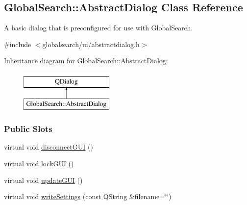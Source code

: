 \hypertarget{classGlobalSearch_1_1AbstractDialog}{}\subsection{Global\+Search\+:\+:Abstract\+Dialog Class Reference}
\label{classGlobalSearch_1_1AbstractDialog}


A basic dialog that is preconfigured for use with Global\+Search.  




{\ttfamily \#include $<$globalsearch/ui/abstractdialog.\+h$>$}

Inheritance diagram for Global\+Search\+:\+:Abstract\+Dialog\+:\begin{figure}[H]
\begin{center}
\leavevmode
\includegraphics[height=2.000000cm]{classGlobalSearch_1_1AbstractDialog}
\end{center}
\end{figure}
\subsubsection*{Public Slots}
\begin{DoxyCompactItemize}
\item 
virtual void \hyperlink{classGlobalSearch_1_1AbstractDialog_af25e016b17402f6695eb9428c197bce6}{disconnect\+G\+U\+I} ()
\item 
virtual void \hyperlink{classGlobalSearch_1_1AbstractDialog_af0a84714b098c38a3311299fc7f547bc}{lock\+G\+U\+I} ()
\item 
virtual void \hyperlink{classGlobalSearch_1_1AbstractDialog_a70a82283ccccb007cf0142f2e166240f}{update\+G\+U\+I} ()
\item 
virtual void \hyperlink{classGlobalSearch_1_1AbstractDialog_afab2e36367be4fa97e891b020afd1e60}{write\+Settings} (const Q\+String \&filename=\char`\"{}\char`\"{})
\end{DoxyCompactItemize}

